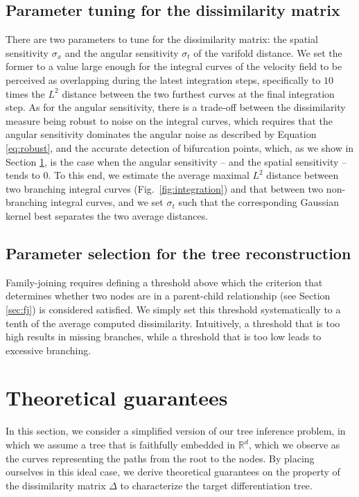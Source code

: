 \documentclass[pdflatex,sn-mathphys-num]{sn-jnl}%
\theoremstyle{thmstyleone}%
\theoremstyle{thmstyletwo}%
\theoremstyle{thmstylethree}%
\newcommand{\bR}{\mathbb R}
\begin{document}
\subsection{Parameter tuning for the dissimilarity matrix}
There are two parameters to tune for the dissimilarity matrix: the spatial sensitivity $\sigma_x$ and the angular sensitivity $\sigma_t$ of the varifold distance. We set the former to a value large enough for the integral curves of the velocity field to be perceived as overlapping during the latest integration steps, specifically to $10$ times the $L^2$ distance between the two furthest curves at the final integration step. As for the angular sensitivity, there is a trade-off between the dissimilarity measure being robust to noise on the integral curves, which requires that the angular sensitivity dominates the angular noise as described by Equation \ref{eq:robust}, and the accurate detection of bifurcation points, which, as we show in Section \ref{sec:theory}, is the case when the angular sensitivity -- and the spatial sensitivity -- tends to $0$. To this end, we estimate the average maximal $L^2$ distance between two branching integral curves (Fig.~\ref{fig:integration}) and that between two non-branching integral curves, and we set $\sigma_t$ such that the corresponding Gaussian kernel best separates the two average distances.

\subsection{Parameter selection for the tree reconstruction}
Family-joining requires defining a threshold above which the criterion that determines whether two nodes are in a parent-child relationship (see Section \ref{sec:fj}) is considered satisfied. We simply set this threshold systematically to a tenth of the average computed dissimilarity. Intuitively, a threshold that is too high results in missing branches, while a threshold that is too low leads to excessive branching. 

\section{Theoretical guarantees}\label{sec:theory}

In this section, we consider a simplified version of our tree inference problem, in which we assume a tree that is faithfully embedded in $\bR^d$, which we observe as the curves representing the paths from the root to the nodes. By placing ourselves in this ideal case, we derive theoretical guarantees on the property of the dissimilarity matrix $\Delta$ to characterize the target differentiation tree.
\end{document}

